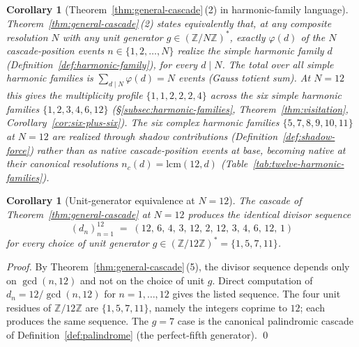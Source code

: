\documentclass[11pt,a4paper]{article}
\newtheorem{corollary}[theorem]{Corollary}
\theoremstyle{definition}
\theoremstyle{remark}
\newcommand{\Z}{\mathbb{Z}}
\begin{document}
\begin{corollary}[Theorem~\ref{thm:general-cascade}\,(2) in harmonic-family language]\label{cor:gcr-harmonic}
Theorem~\ref{thm:general-cascade}\,(2) states equivalently that, at any composite resolution $N$ with any unit generator $g \in (\Z/N\Z)^{*}$, exactly $\varphi(d)$ of the $N$ cascade-position events $n \in \{1,2,\ldots,N\}$ realize the simple harmonic family $d$ (Definition~\ref{def:harmonic-family}), for every $d \mid N$. The total over all simple harmonic families is $\sum_{d \mid N}\varphi(d) = N$ events (Gauss totient sum). At $N=12$ this gives the multiplicity profile $\{1,1,2,2,2,4\}$ across the six simple harmonic families $\{1,2,3,4,6,12\}$ (\S\ref{subsec:harmonic-families}, Theorem~\ref{thm:visitation}, Corollary~\ref{cor:six-plus-six}). The six complex harmonic families $\{5,7,8,9,10,11\}$ at $N=12$ are realized through shadow contributions (Definition~\ref{def:shadow-force}) rather than as native cascade-position events at base, becoming native at their canonical resolutions $n_{c}(d) = \mathrm{lcm}(12,d)$ (Table~\ref{tab:twelve-harmonic-families}).
\end{corollary}

\begin{corollary}[Unit-generator equivalence at $N=12$]\label{cor:unit-equivalence}
The cascade of Theorem~\ref{thm:general-cascade} at $N=12$ produces the identical divisor sequence
\[
(d_{n})_{n=1}^{12} \;=\; (12,\,6,\,4,\,3,\,12,\,2,\,12,\,3,\,4,\,6,\,12,\,1)
\]
for every choice of unit generator $g \in (\mathbb{Z}/12\mathbb{Z})^{*} = \{1,5,7,11\}$.
\end{corollary}

\begin{proof}
By Theorem~\ref{thm:general-cascade}\,(5), the divisor sequence depends only on $\gcd(n,12)$ and not on the choice of unit $g$. Direct computation of $d_{n} = 12/\gcd(n,12)$ for $n = 1,\ldots,12$ gives the listed sequence. The four unit residues of $\mathbb{Z}/12\mathbb{Z}$ are $\{1,5,7,11\}$, namely the integers coprime to $12$; each produces the same sequence. The $g=7$ case is the canonical palindromic cascade of Definition~\ref{def:palindrome} (the perfect-fifth generator). \qed
\end{proof}
\end{document}
